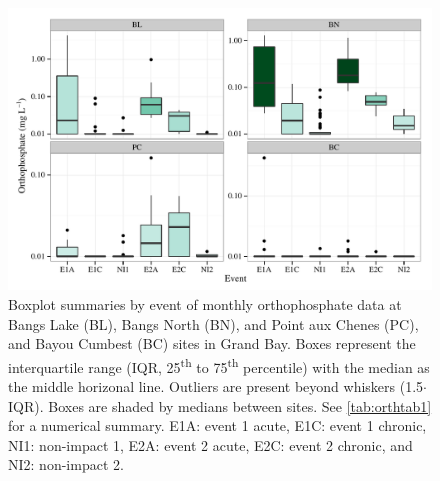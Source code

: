 \documentclass[letterpaper,12pt]{article}\usepackage[]{graphicx}\usepackage[]{color}
\makeatletter
\def\maxwidth{ %
  \ifdim\Gin@nat@width>\linewidth
    \linewidth
  \else
    \Gin@nat@width
  \fi
}
\makeatother
\begin{document}
\begin{figure}[!ht]

{\centering \includegraphics[width=\maxwidth]{figs/orthfig-1} 

}

\caption{Boxplot summaries by event of monthly orthophosphate data at Bangs Lake (BL), Bangs North (BN), and Point aux Chenes (PC), and Bayou Cumbest (BC) sites in Grand Bay.  Boxes represent the interquartile range (IQR, 25\textsuperscript{th} to 75\textsuperscript{th} percentile) with the median as the middle horizonal line.  Outliers are present beyond whiskers (1.5$\cdot$IQR). Boxes are shaded by medians between sites.  See \cref{tab:orthtab1} for a numerical summary. E1A: event 1 acute, E1C: event 1 chronic, NI1: non-impact 1, E2A: event 2 acute, E2C: event 2 chronic, and NI2: non-impact 2.}\label{fig:orthfig}
\end{figure}


\clearpage
\end{document}
